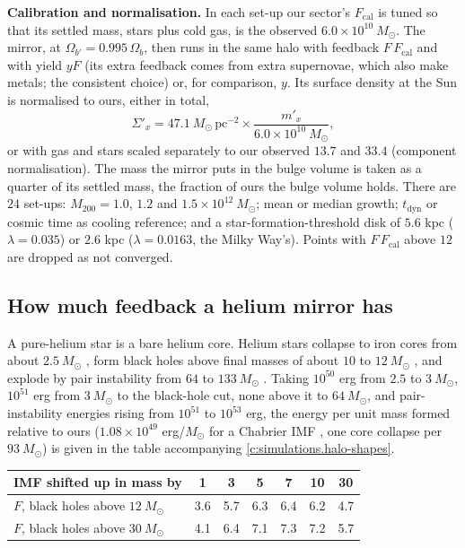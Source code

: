 \documentclass[11pt]{article}
\theoremstyle{definition}
\theoremstyle{plain}
\providecommand{\Msun}{}\renewcommand{\Msun}{M_{\odot}}
\begin{document}
\label{c:note.simulations.setting-model-2}
\textbf{Calibration and normalisation.} In each set-up our sector's $F_{\mathrm{cal}}$ is tuned so that its settled mass, stars plus cold gas, is the observed $6.0 \times 10^{10}\ \Msun$. The mirror, at $\Omega_{b'} = 0.995\,\Omega_{b}$, then runs in the same halo with feedback $F\,F_{\mathrm{cal}}$ and with yield $yF$ (its extra feedback comes from extra supernovae, which also make metals; the consistent choice) or, for comparison, $y$. Its surface density at the Sun is normalised to ours, either in total,
\[
\Sigma'_{x} = 47.1\ \Msun\,\mathrm{pc^{-2}}\times\frac{m'_{x}}{6.0 \times 10^{10}\ \Msun},
\]
or with gas and stars scaled separately to our observed $13.7$ and $33.4$ (component normalisation). The mass the mirror puts in the bulge volume is taken as a quarter of its settled mass, the fraction of ours the bulge volume holds. There are $24$ set-ups: $M_{200} = 1.0$, $1.2$ and $1.5 \times 10^{12}\ \Msun$; mean or median growth; $t_{\mathrm{dyn}}$ or cosmic time as cooling reference; and a star-formation-threshold disk of $5.6$ kpc ($\lambda = 0.035$) or $2.6$ kpc ($\lambda = 0.0163$, the Milky Way's). Points with $F\,F_{\mathrm{cal}}$ above $12$ are dropped as not converged.

\subsection*{How much feedback a helium mirror has}
\label{c:note.simulations.setting-how-much-feedback-helium-mirror}
A pure-helium star is a bare helium core. Helium stars collapse to iron cores from about $2.5\ \Msun$ \cite{Woosley2019}, form black holes above final masses of about $10$ to $12\ \Msun$ \cite{Woosley2019, Ertl2020}, and explode by pair instability from $64$ to $133\ \Msun$ \cite{HegerWoosley2002}. Taking $10^{50}$ erg from $2.5$ to $3\ \Msun$, $10^{51}$ erg from $3\ \Msun$ to the black-hole cut, none above it to $64\ \Msun$, and pair-instability energies rising from $10^{51}$ to $10^{53}$ erg, the energy per unit mass formed relative to ours ($1.08 \times 10^{49}$ erg/$\Msun$ for a Chabrier IMF \cite{Chabrier2003}, one core collapse per $93\ \Msun$) is given in the table accompanying \ref{c:simulations.halo-shapes}.
\centering \begin{tabular}{@{}lcccccc@{}}
\toprule
IMF shifted up in mass by & 1 & 3 & 5 & 7 & 10 & 30\\
\midrule
$F$, black holes above $12\ \Msun$ & 3.6 & 5.7 & 6.3 & 6.4 & 6.2 & 4.7\\
$F$, black holes above $30\ \Msun$ & 4.1 & 6.4 & 7.1 & 7.3 & 7.2 & 5.7\\
\bottomrule
\end{tabular}
\end{document}
